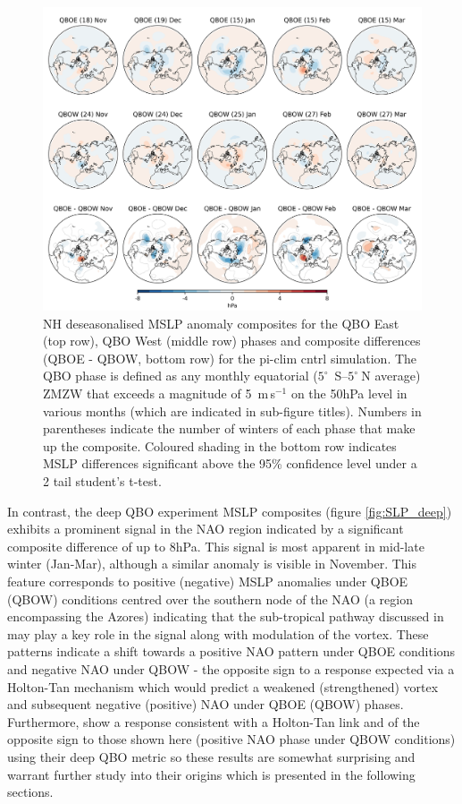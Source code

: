 \begin{figure}[h!]
\begin{center}
\noindent\includegraphics[width =0.8\linewidth]{Figures/Figures-deepQBO/SLP_composites_individual_months_QBO_phases_U_piclim_30hPa_5thresh.png}
\caption[]{NH deseasonalised MSLP anomaly composites for the QBO East (top row), QBO West (middle row) phases and composite differences (QBOE - QBOW, bottom row) for the pi-clim cntrl simulation. The QBO phase is defined as any monthly equatorial ($5^{\circ}$\ S--$5^{\circ}\ $N average) ZMZW that exceeds a magnitude of 5\ m\,s$^{-1}$ on the 50hPa level in various months (which are indicated in sub-figure titles). Numbers in parentheses indicate the number of winters of each phase that make up the composite. Coloured shading in the bottom row indicates MSLP differences significant above the 95\% confidence level under a 2 tail student’s t-test.}
\label{fig:SLP_piclim}
\end{center}
\end{figure}

In contrast, the deep QBO experiment MSLP composites (figure \ref{fig:SLP_deep}) exhibits a prominent signal in the NAO region indicated by a significant composite difference of up to 8hPa. This signal is most apparent in mid-late winter (Jan-Mar), although a similar anomaly is visible in November. This feature corresponds to positive (negative) MSLP anomalies under QBOE (QBOW) conditions centred over the southern node of the NAO (a region encompassing the Azores) indicating that the sub-tropical pathway discussed in \cite{graySurface2018b} may play a key role in the signal along with modulation of the vortex. These patterns indicate a shift towards a positive NAO pattern under QBOE conditions and negative NAO under QBOW - the opposite sign to a response expected via a Holton-Tan mechanism which would predict a weakened (strengthened) vortex and subsequent negative (positive) NAO under QBOE (QBOW) phases. Furthermore, \cite{andrewsObserved2019d} show a response consistent with a Holton-Tan link and of the opposite sign to those shown here (positive NAO phase under QBOW conditions) using their deep QBO metric so these results are somewhat surprising and warrant further study into their origins which is presented in the following sections.

